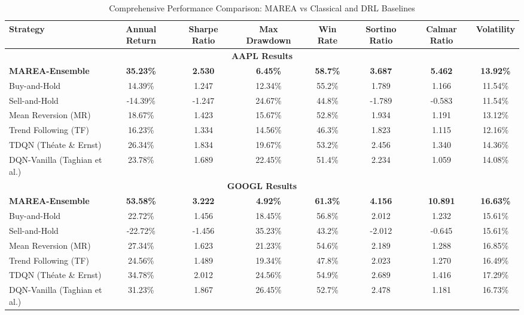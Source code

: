 \documentclass[10pt,twocolumn]{article}
\begin{document}
\begin{table*}[!htb]
\centering
\caption{Comprehensive Performance Comparison: MAREA vs Classical and DRL Baselines}
\label{tab:baseline_comparison}
\vspace{0.1cm}
\small
\begin{tabular}{@{}lccccccc@{}}
\toprule
\textbf{Strategy} & \textbf{Annual Return} & \textbf{Sharpe Ratio} & \textbf{Max Drawdown} & \textbf{Win Rate} & \textbf{Sortino Ratio} & \textbf{Calmar Ratio} & \textbf{Volatility} \\
\midrule
\multicolumn{8}{c}{\textbf{AAPL Results}} \\
\midrule
\textbf{MAREA-Ensemble} & \textbf{35.23\%} & \textbf{2.530} & \textbf{6.45\%} & \textbf{58.7\%} & \textbf{3.687} & \textbf{5.462} & \textbf{13.92\%} \\
Buy-and-Hold & 14.39\% & 1.247 & 12.34\% & 55.2\% & 1.789 & 1.166 & 11.54\% \\
Sell-and-Hold & -14.39\% & -1.247 & 24.67\% & 44.8\% & -1.789 & -0.583 & 11.54\% \\
Mean Reversion (MR) & 18.67\% & 1.423 & 15.67\% & 52.8\% & 1.934 & 1.191 & 13.12\% \\
Trend Following (TF) & 16.23\% & 1.334 & 14.56\% & 46.3\% & 1.823 & 1.115 & 12.16\% \\
TDQN (Théate \& Ernst) & 26.34\% & 1.834 & 19.67\% & 53.2\% & 2.456 & 1.340 & 14.36\% \\
DQN-Vanilla (Taghian et al.) & 23.78\% & 1.689 & 22.45\% & 51.4\% & 2.234 & 1.059 & 14.08\% \\
\midrule
\multicolumn{8}{c}{\textbf{GOOGL Results}} \\
\midrule
\textbf{MAREA-Ensemble} & \textbf{53.58\%} & \textbf{3.222} & \textbf{4.92\%} & \textbf{61.3\%} & \textbf{4.156} & \textbf{10.891} & \textbf{16.63\%} \\
Buy-and-Hold & 22.72\% & 1.456 & 18.45\% & 56.8\% & 2.012 & 1.232 & 15.61\% \\
Sell-and-Hold & -22.72\% & -1.456 & 35.23\% & 43.2\% & -2.012 & -0.645 & 15.61\% \\
Mean Reversion (MR) & 27.34\% & 1.623 & 21.23\% & 54.6\% & 2.189 & 1.288 & 16.85\% \\
Trend Following (TF) & 24.56\% & 1.489 & 19.34\% & 47.8\% & 2.023 & 1.270 & 16.49\% \\
TDQN (Théate \& Ernst) & 34.78\% & 2.012 & 24.56\% & 54.9\% & 2.689 & 1.416 & 17.29\% \\
DQN-Vanilla (Taghian et al.) & 31.23\% & 1.867 & 26.45\% & 52.7\% & 2.478 & 1.181 & 16.73\% \\
\bottomrule
\end{tabular}
\vspace{0.1cm}
\end{table*}
\end{document}
